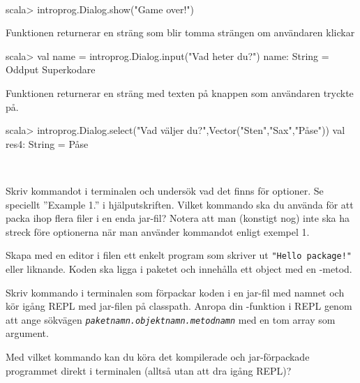 \SOLUTION

\TaskSolved \what~

\SubtaskSolved
\begin{REPL}
scala> introprog.Dialog.show("Game over!")
\end{REPL}

\SubtaskSolved Funktionen  returnerar en sträng som blir tomma strängen  om användaren klickar 
\begin{REPL}
scala> val name = introprog.Dialog.input("Vad heter du?")
name: String = Oddput Superkodare
\end{REPL}

\SubtaskSolved Funktionen  returnerar en sträng med texten på knappen som användaren tryckte på.
\begin{REPL}
scala> introprog.Dialog.select("Vad väljer du?",Vector("Sten","Sax","Påse"))
val res4: String = Påse
\end{REPL}

\QUESTEND





\QUESTBEGIN

\Task\Uberkurs  \what~

\Subtask Skriv kommandot  i terminalen och undersök vad det finns för optioner. Se speciellt ''Example 1.'' i hjälputskriften. Vilket kommando ska du använda för att packa ihop flera filer i en enda jar-fil? Notera att man (konstigt nog) inte ska ha streck före optionerna när man använder kommandot  enligt exempel 1.

\Subtask Skapa med en editor i filen  ett enkelt program som skriver ut \texttt{"Hello package!"} eller liknande. Koden ska ligga i paketet  och innehålla ett object  med en -metod.

\Subtask Skriv kommando i terminalen som förpackar koden i en jar-fil med namnet  och kör igång REPL med jar-filen på classpath. Anropa din -funktion i REPL genom att ange sökvägen \textit{\texttt{paketnamn.objektnamn.metodnamn}} med en tom array som argument.

\Subtask Med vilket kommando kan du köra det kompilerade och jar-förpackade programmet direkt i terminalen (alltså utan att dra igång REPL)?

\SOLUTION

\TaskSolved \what

